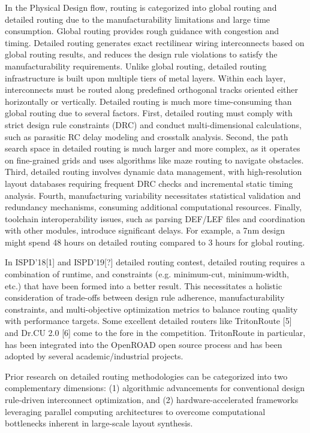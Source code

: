 In the Physical Design flow, routing is categorized into global routing and detailed routing due to the manufacturability limitations and large time consumption. 
Global routing provides rough guidance with congestion and timing. Detailed routing generates exact rectilinear wiring interconnects based on global routing results, and reduces the design rule violations to satisfy the manufacturability requirements.
Unlike global routing, detailed routing infrastructure is built upon multiple tiers of metal layers. Within each layer, interconnects must be routed along predefined orthogonal tracks oriented either horizontally or vertically. 
Detailed routing is much more time-consuming than global routing due to several factors. 
First, detailed routing must comply with strict design rule constraints (DRC) and conduct multi-dimensional calculations, such as parasitic RC delay modeling and crosstalk analysis. 
Second, the path search space in detailed routing is much larger and more complex, as it operates on fine-grained grids and uses algorithms like maze routing to navigate obstacles. 
Third, detailed routing involves dynamic data management, with high-resolution layout databases requiring frequent DRC checks and incremental static timing analysis. 
Fourth, manufacturing variability necessitates statistical validation and redundancy mechanisms, consuming additional computational resources. 
Finally, toolchain interoperability issues, such as parsing DEF/LEF files and coordination with other modules, introduce significant delays. 
For example, a 7nm design might spend 48 hours on detailed routing compared to 3 hours for global routing.

In ISPD'18[1] and ISPD'19[?] detailed routing contest, detailed routing requires a combination of runtime, and constraints (e.g. minimum-cut, minimum-width, etc.) that have been formed into a better result. This necessitates a holistic consideration of trade-offs between design rule adherence, manufacturability constraints, and multi-objective optimization metrics to balance routing quality with performance targets.
Some excellent detailed routers like TritonRoute [5] and Dr.CU 2.0 [6] come to the fore in the competition. TritonRoute in particular, has been integrated into the OpenROAD open source process and has been adopted by several academic/industrial projects.

Prior research on detailed routing methodologies can be categorized into two complementary dimensions: 
(1) algorithmic advancements for conventional design rule-driven interconnect optimization, 
and (2) hardware-accelerated frameworks leveraging parallel computing architectures to overcome computational bottlenecks inherent in large-scale layout synthesis.


